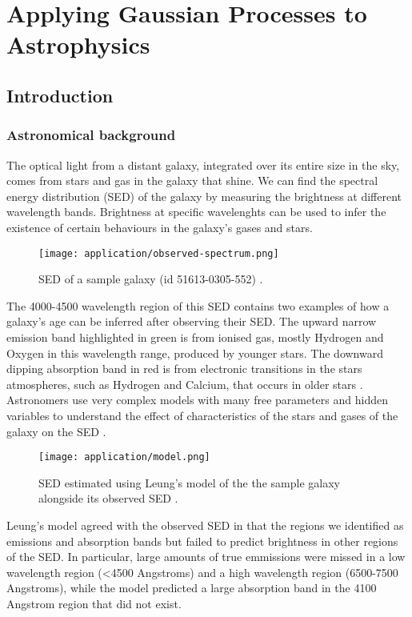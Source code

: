 \section{Applying Gaussian Processes to Astrophysics}
% 
% 
% 
% 
% 
% 
% 
% 


\subsection{Introduction}

\subsubsection{Astronomical background}
The optical light from a distant galaxy, integrated over its entire size in the sky, comes from stars and gas in the galaxy that shine. We can find the spectral energy distribution (SED) of the galaxy by measuring the brightness at different wavelength bands. Brightness at specific wavelenghts can be used to infer the existence of certain behaviours in the galaxy's gases and stars. 

\begin{figure}[H]
	\texttt{[image: application/observed-spectrum.png]}
    \caption{SED of a sample galaxy (id 51613-0305-552) \cite{galaxy-gp-noise}.}
\end{figure}
The 4000-4500 wavelength region of this SED contains two examples of how a galaxy's age can be inferred after observing their SED. The upward narrow emission band highlighted in green is from ionised gas, mostly Hydrogen and Oxygen in this wavelength range, produced by younger stars. The downward dipping absorption band in red is from electronic transitions in the stars atmospheres, such as Hydrogen and Calcium, that occurs in older stars \cite{galaxy-spectra-101}. Astronomers use very complex models with many free parameters and hidden variables to understand the effect of characteristics of the stars and gases of the galaxy on the SED \cite{galaxy-spectra-101}.

\begin{figure}[H]
    \texttt{[image: application/model.png]}
    \caption{SED estimated using Leung's model of the the sample galaxy alongside its observed SED \cite{galaxy-gp-noise}.}
\end{figure}
Leung's model \cite{galaxy-gp-noise} agreed with the observed SED in that the regions we identified as emissions and absorption bands but failed to predict brightness in other regions of the SED. In particular, large amounts of true emmissions were missed in a low wavelength region (<4500 Angstroms) and a high wavelength region (6500-7500 Angstroms), while the model predicted a large absorption band in the 4100 Angstrom region that did not exist.

